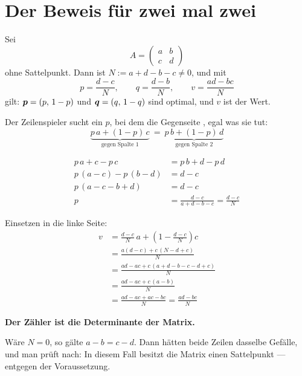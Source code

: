\section{Der Beweis für zwei mal zwei}

\begin{merksatz}
Sei
\[ A = \begin{pmatrix} a & b\\ c & d\end{pmatrix} \]
ohne Sattelpunkt. Dann ist $N := a+d-b-c \ne 0$, und mit
\[ p = \frac{d-c}{N}, \qquad q = \frac{d-b}{N}, \qquad v = \frac{ad-bc}{N} \]
gilt: $\boldsymbol{p} = (p,\,1-p)$ und $\boldsymbol{q} = (q,\,1-q)$ sind optimal, und $v$ ist der Wert.

Der Zeilenspieler sucht ein $p$, bei dem die Gegenseite , egal was sie tut:
\[ \underbrace{p\,a + (1-p)\,c}_{\text{gegen Spalte 1}} \ =\ \underbrace{p\,b + (1-p)\,d}_{\text{gegen Spalte 2}} \]

\begin{align*}
p\,a + c - p\,c &= p\,b + d - p\,d\\
p\,(a-c) - p\,(b-d) &= d-c\\
p\,(a-c-b+d) &= d-c\\
p &= \frac{d-c}{a+d-b-c} = \frac{d-c}{N}
\end{align*}

Einsetzen in die linke Seite:
\begin{align*}
v &= \frac{d-c}{N}\,a + \left(1-\frac{d-c}{N}\right)c\\
&= \frac{a(d-c) + c\,(N - d + c)}{N}\\
&= \frac{ad-ac + c\,(a+d-b-c-d+c)}{N}\\
&= \frac{ad-ac + c\,(a-b)}{N}\\
&= \frac{ad-ac+ac-bc}{N} = \frac{ad-bc}{N}
\end{align*}

\begin{center}
\begin{minipage}{0.9\textwidth}
\textbf{Der Zähler ist die Determinante der Matrix.}
\end{minipage}
\end{center}

Wäre $N = 0$, so gälte $a-b = c-d$. Dann hätten beide Zeilen dasselbe Gefälle, und man prüft nach: In diesem Fall besitzt die Matrix einen Sattelpunkt --- entgegen der Voraussetzung.


\end{merksatz}
